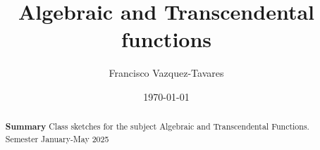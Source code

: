 \documentclass[a4paper]{tufte-handout} %
\title{ Algebraic and Transcendental functions }
\author{Francisco Vazquez-Tavares}
\date{\today} %
\begin{document}
\maketitle %


\begin{abstract}
	\textbf{Summary}
        Class sketches for the subject Algebraic and Transcendental Functions.
        Semester January-May 2025
\end{abstract}



%
%




\nocite{*}


\end{document}
